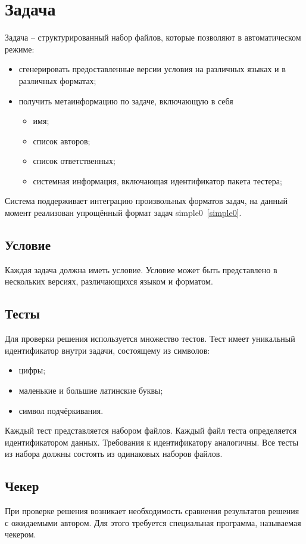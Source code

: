 \section{Задача}
\label{bacsproblem}
Задача -- структурированный набор файлов,
которые позволяют в автоматическом режиме:
\begin{itemize}
    \item сгенерировать предоставленные версии условия
        на различных языках и в различных форматах;
    \item получить метаинформацию по задаче, включающую в себя
        \begin{itemize}
            \item имя;
            \item список авторов;
            \item список ответственных;
            \item системная информация, включающая идентификатор пакета тестера;
        \end{itemize}
\end{itemize}

Система поддерживает интеграцию произвольных форматов задач,
на данный момент реализован упрощённый формат задач simple0~\ref{simple0}.

\subsection{Условие}
Каждая задача должна иметь условие. Условие может
быть представлено в нескольких версиях,
различающихся языком и форматом.

\subsection{Тесты}
Для проверки решения используется множество тестов.
Тест имеет уникальный идентификатор внутри задачи,
состоящему из символов:
\begin{itemize}
    \item цифры;
    \item маленькие и большие латинские буквы;
    \item символ подчёркивания.
\end{itemize}

Каждый тест представляется набором файлов.
Каждый файл теста определяется идентификатором данных.
Требования к идентификатору аналогичны.
Все тесты из набора должны состоять из одинаковых наборов файлов.

\subsection{Чекер}
При проверке решения возникает необходимость сравнения результатов решения
с ожидаемыми автором. Для этого требуется специальная программа, называемая чекером.

